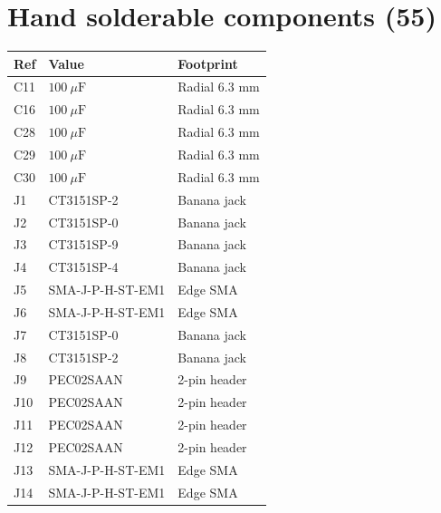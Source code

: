 \documentclass[10pt,letterpaper]{article}
\begin{document}
\section*{Hand solderable components (55)}
\noindent \begin{tabular}[t]{@{}lll@{}}\toprule Ref & Value & Footprint\\\midrule
C11 & $100\:\mu\text{F}$ & Radial 6.3 mm\\
C16 & $100\:\mu\text{F}$ & Radial 6.3 mm\\
C28 & $100\:\mu\text{F}$ & Radial 6.3 mm\\
C29 & $100\:\mu\text{F}$ & Radial 6.3 mm\\
C30 & $100\:\mu\text{F}$ & Radial 6.3 mm\\
J1 & CT3151SP-2 & Banana jack\\
J2 & CT3151SP-0 & Banana jack\\
J3 & CT3151SP-9 & Banana jack\\
J4 & CT3151SP-4 & Banana jack\\
J5 & SMA-J-P-H-ST-EM1 & Edge SMA\\
J6 & SMA-J-P-H-ST-EM1 & Edge SMA\\
J7 & CT3151SP-0 & Banana jack\\
J8 & CT3151SP-2 & Banana jack\\
J9 & PEC02SAAN & 2-pin header\\
J10 & PEC02SAAN & 2-pin header\\
J11 & PEC02SAAN & 2-pin header\\
J12 & PEC02SAAN & 2-pin header\\
J13 & SMA-J-P-H-ST-EM1 & Edge SMA\\
J14 & SMA-J-P-H-ST-EM1 & Edge SMA\\
\bottomrule\end{tabular}\hfill
\end{document}
